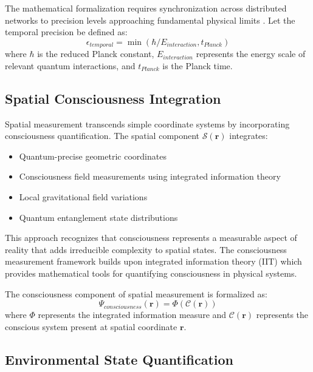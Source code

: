 \documentclass[12pt,a4paper]{article}
\begin{document}
The mathematical formalization requires synchronization across distributed networks to precision levels approaching fundamental physical limits \cite{planck1900,heisenberg1927}. Let the temporal precision be defined as:
\begin{equation}
\epsilon_{temporal} = \min(\hbar/E_{interaction}, t_{Planck})
\end{equation}
where $\hbar$ is the reduced Planck constant, $E_{interaction}$ represents the energy scale of relevant quantum interactions, and $t_{Planck}$ is the Planck time.

\subsection{Spatial Consciousness Integration}

Spatial measurement transcends simple coordinate systems by incorporating consciousness quantification. The spatial component $\mathcal{S}(\mathbf{r})$ integrates:

\begin{itemize}
\item Quantum-precise geometric coordinates
\item Consciousness field measurements using integrated information theory
\item Local gravitational field variations
\item Quantum entanglement state distributions
\end{itemize}

This approach recognizes that consciousness represents a measurable aspect of reality that adds irreducible complexity to spatial states. The consciousness measurement framework builds upon integrated information theory (IIT) \cite{tononi2004} which provides mathematical tools for quantifying consciousness in physical systems.

The consciousness component of spatial measurement is formalized as:
\begin{equation}
\Psi_{consciousness}(\mathbf{r}) = \Phi(\mathcal{C}(\mathbf{r}))
\end{equation}
where $\Phi$ represents the integrated information measure and $\mathcal{C}(\mathbf{r})$ represents the conscious system present at spatial coordinate $\mathbf{r}$.

\subsection{Environmental State Quantification}
\end{document}
